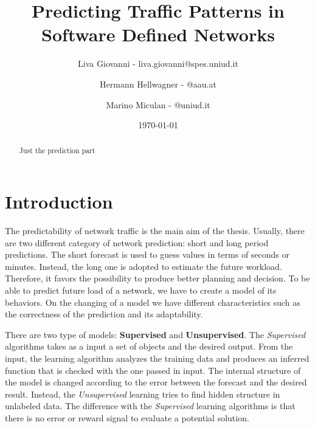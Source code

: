\documentclass[12pt]{article}
\title{Predicting Traffic Patterns in\\ Software Defined Networks}
\author{
	Liva Giovanni - liva.giovanni@spes.uniud.it
	\and
	Hermann Hellwagner - @aau.at
	\and
	Marino Miculan - @uniud.it
}
\date{\today}
\begin{document}
	
\maketitle

\begin{abstract}
	Just the prediction part
\end{abstract}

\newpage

\section{Introduction}
The predictability of network traffic is the main aim of the thesis. 
Usually, there are two different category of network prediction: short and long period predictions.
The short forecast is used to guess values in terms of seconds or minutes. 
Instead, the long one is adopted to estimate the future workload. 
Therefore, it favors the possibility to produce better planning and decision.
To be able to predict future load of a network, we have to create a model of its behaviors. 
On the changing of a model we have different characteristics such as the correctness of the prediction and its adaptability.


There are two type of models: \textbf{Supervised} and \textbf{Unsupervised}.
The \textit{Supervised} algorithms takes as a input a set of objects and the desired output. 
From the input, the learning algorithm analyzes the training data and produces an inferred function that is checked with the one passed in input. The internal structure of the model is changed according to the error between the forecast and the desired result.
Instead, the \textit{Unsupervised} learning tries  to find hidden structure in unlabeled data. 
The difference with the \textit{Supervised} learning algorithms is that there is no error or reward signal to evaluate a potential solution.
\end{document}
